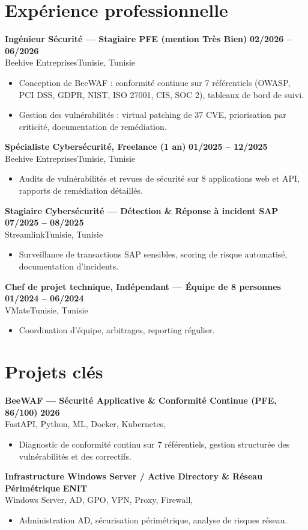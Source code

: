 \documentclass[a4paper,9pt]{article}
\newcommand{\cventry}[4]{\textbf{#1} \hfill \textbf{#4}\\[0.2pt]#2{\ifx\relax#3\relax\else, #3\fi}\par\vspace{0.3pt}}
\begin{document}
\section{Expérience professionnelle}
\cventry{Ingénieur Sécurité --- Stagiaire PFE (mention Très Bien)}{Beehive Entreprises}{Tunisie}{02/2026 -- 06/2026}
\begin{itemize}
  \item Conception de BeeWAF : conformité continue sur 7 référentiels (OWASP, PCI DSS, GDPR, NIST, ISO 27001, CIS, SOC 2), tableaux de bord de suivi.
  \item Gestion des vulnérabilités : virtual patching de 37 CVE, priorisation par criticité, documentation de remédiation.
\end{itemize}
\cventry{Spécialiste Cybersécurité, Freelance (1 an)}{Beehive Entreprises}{Tunisie}{01/2025 -- 12/2025}
\begin{itemize}
  \item Audits de vulnérabilités et revues de sécurité sur 8 applications web et API, rapports de remédiation détaillés.
\end{itemize}
\cventry{Stagiaire Cybersécurité --- Détection \& Réponse à incident SAP}{Streamlink}{Tunisie}{07/2025 -- 08/2025}
\begin{itemize}
  \item Surveillance de transactions SAP sensibles, scoring de risque automatisé, documentation d'incidents.
\end{itemize}
\cventry{Chef de projet technique, Indépendant --- Équipe de 8 personnes}{VMate}{Tunisie}{01/2024 -- 06/2024}
\begin{itemize}
  \item Coordination d'équipe, arbitrages, reporting régulier.
\end{itemize}
\section{Projets clés}
\cventry{BeeWAF --- Sécurité Applicative \& Conformité Continue (PFE, 86/100)}{FastAPI, Python, ML, Docker, Kubernetes}{}{2026}
\begin{itemize}
  \item Diagnostic de conformité continu sur 7 référentiels, gestion structurée des vulnérabilités et des correctifs.
\end{itemize}
\cventry{Infrastructure Windows Server / Active Directory \& Réseau Périmétrique}{Windows Server, AD, GPO, VPN, Proxy, Firewall}{}{ENIT}
\begin{itemize}
  \item Administration AD, sécurisation périmétrique, analyse de risques réseau.
\end{itemize}
\end{document}
